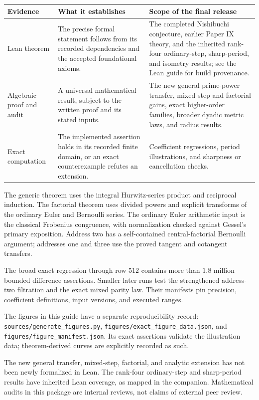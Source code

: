 \begin{center}
\begin{tabular}{p{.23\linewidth}p{.34\linewidth}p{.34\linewidth}}
\toprule
Evidence & What it establishes & Scope of the final release \\
\midrule
Lean theorem & The precise formal statement follows from its recorded
dependencies and the accepted foundational axioms. & The completed Nishibuchi
conjecture, earlier Paper IX theory, and the inherited rank-four ordinary-step,
sharp-period, and isometry results; see the Lean guide for build provenance. \\
\addlinespace
Algebraic proof and audit & A universal mathematical result, subject to the
written proof and its stated inputs. & The new general prime-power transfer,
mixed-step and factorial gains, exact higher-order families, broader dyadic
metric laws, and radius results. \\
\addlinespace
Exact computation & The implemented assertion holds in its recorded finite
domain, or an exact counterexample refutes an extension. & Coefficient
regressions, period illustrations, and sharpness or cancellation checks. \\
\bottomrule
\end{tabular}
\end{center}

The generic theorem uses the integral Hurwitz-series product and reciprocal
induction. The factorial theorem uses divided powers and explicit transforms
of the ordinary Euler and Bernoulli series. The ordinary Euler arithmetic
input is the classical Frobenius congruence, with normalization checked against
Gessel's primary exposition. Address two has a self-contained central-factorial
Bernoulli argument; addresses one and three use the proved tangent and
cotangent transfers.

The broad exact regression through row $512$ contains more than $1.8$ million
bounded difference assertions. Smaller later runs test the strengthened
address-two filtration and the exact mixed parity law. Their manifests pin
precision, coefficient definitions, input versions, and executed ranges.

The figures in this guide have a separate reproducibility record:
\texttt{sources/generate\_figures.py},
\texttt{figures/exact\_figure\_data.json}, and
\texttt{figures/figure\_manifest.json}. Its exact assertions validate the
illustration data; theorem-derived curves are explicitly recorded as such.

The new general transfer, mixed-step, factorial, and analytic extension has
not been newly formalized in Lean. The rank-four ordinary-step and sharp-period
results have inherited Lean coverage, as mapped in the companion. Mathematical audits
in this package are internal reviews, not claims of external peer review.

